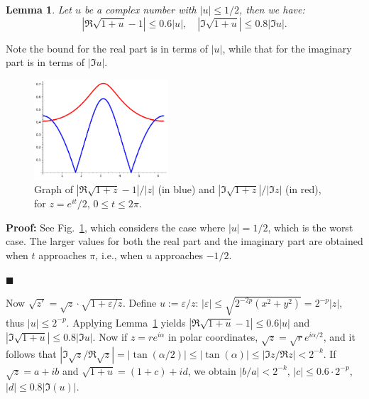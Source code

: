 \documentclass [11pt]{article}
\renewcommand {\epsilon}{\varepsilon}
\newtheorem{lemma}[theorem]{Lemma}
\newenvironment{proof}{\noindent \textbf {Proof:}}{{\hspace* {\fill}$\blacksquare$}}
\begin{document}
\begin{lemma} \label{lem:sqrtaux}
  Let $u$ be a complex number with $|u| \le 1/2$, then we have:
  \[ |\Re \sqrt{1+u}-1| \le 0.6 |u|, \quad |\Im \sqrt{1+u}| \le 0.8 |\Im u|. \]
\end{lemma}
Note the bound for the real part is in terms of $|u|$, while that for the imaginary
part is in terms of $|\Im u|$.
\begin{figure}[htp]
  \centerline{\includegraphics[width=5cm]{fig_sqrt.pdf}}
  \caption{Graph of $|\Re \sqrt{1+z}-1|/|z|$ (in blue) and
    $|\Im \sqrt{1+z}|/|\Im z|$ (in red), for $z = e^{i t}/2$,
    $0 \le t \le 2\pi$.} \label{fig_sqrt}
\end{figure}

\begin{proof}
  See Fig.~\ref{fig_sqrt}, which considers the case where $|u|=1/2$,
  which is the worst case.
  The larger values for both the real part
  and the imaginary part are obtained when $t$ approaches $\pi$,
  i.e., when $u$ approaches $-1/2$.

\end{proof}

Now $\sqrt{z'} = \sqrt{z} \cdot \sqrt{1+\epsilon/z}$.
Define $u := \epsilon/z$:
$|\epsilon| \le \sqrt{2^{-2p} (x^2 + y^2)} = 2^{-p} |z|$,
thus $|u| \le 2^{-p}$.
Applying Lemma~\ref{lem:sqrtaux}
yields $|\Re \sqrt{1+u}-1| \le 0.6 |u|$ and
$|\Im\sqrt{1+u}| \le 0.8 |\Im u|$.
Now if $z = r e^{i\alpha}$ in polar coordinates,
$\sqrt{z} = \sqrt{r} e^{i\alpha/2}$, and it follows that
$|\Im\sqrt{z}/\Re\sqrt{z}| = |\tan(\alpha/2)| \le |\tan(\alpha)|
\le |\Im z/\Re z| < 2^{-k}$.
If $\sqrt{z} = a+ib$ and $\sqrt{1+u} = (1+c)+id$, we obtain
$|b/a| < 2^{-k}$, $|c| \le 0.6 \cdot 2^{-p}$, $|d| \le 0.8 |\Im(u)|$.
\end{document}
